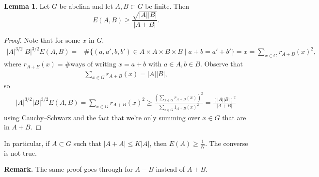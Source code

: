 \documentclass{article}
\theoremstyle{definition}
\newtheorem{lemma}[theorem]{Lemma}
\begin{document}
\begin{lemma}\label{lemma2.13}
    Let $G$ be abelian and let $A,B \subset G$ be finite. Then \[
    E(A,B) \ge \frac{\sqrt{\left|A\right|\left|B\right|}}{\left|A+B\right|}.
    \]
\end{lemma}
\begin{proof}
    Note that for some $x$ in $G$, 
    \begin{align*}
        \left|A\right|^{3/2}\left|B\right|^{3/2} E(A,B) =& \#\{(a,a',b,b') \in A \times A \times B \times B \mid a+b=a'+b'\} = x = \sum_{x \in G}^{} r_{A+B}(x)^2,
    \end{align*}
    where $r_{A+B}(x) = \# \text{ways of writing }x=a+b \text{ with }a \in A, b \in B$. Observe that 
    \begin{align*}
        \sum_{x \in G}^{} r_{A+B}(x) = \left|A\right|\left|B\right|,
    \end{align*}
    so \begin{align*}
        \left|A\right|^{3/2}\left|B\right|^{3/2}E(A,B) = \sum_{x \in G}^{} r_{A+B}(x)^2 \ge \frac{\left(\sum_{x \in G}^{} r_{A+B}(x)\right)^2}{\sum_{x \in G}^{} 1_{A+B}(x)^2} = \frac{(\left|A\right|\left|B\right|)^2}{\left|A+B\right|}
    \end{align*}
    using Cauchy--Schwarz and the fact that we're only summing over $x \in G$ that are in $A+B$.
\end{proof}
In particular, if $A \subset G$ such that $\left|A+A\right|\le K\left|A\right|$, then $E(A) \ge \frac{1}{K}$. The converse is not true.
\vspace{1mm}
 
\textbf{Remark.} The same proof goes through for $A-B$ instead of $A+B$.
\end{document}
